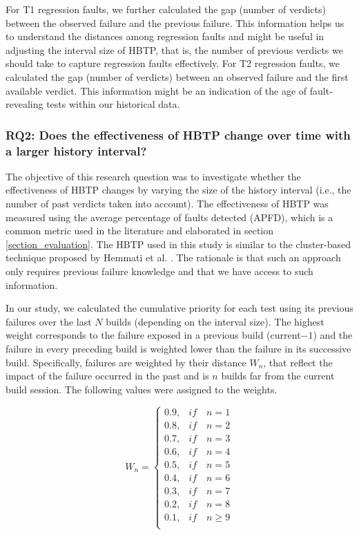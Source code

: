 \documentclass[1p]{elsarticle}
\begin{document}
For T1 regression faults, we further calculated the gap (number of verdicts) between the observed failure and the previous failure. This information helps us to understand the distances among regression faults and might be useful in adjusting the interval size of HBTP, that is, the number of previous verdicts we should take to capture regression faults effectively. For T2 regression faults, we calculated the gap (number of verdicts) between an observed failure and the first available verdict. This information might be an indication of the age of fault-revealing tests within our historical data.

\subsubsection{RQ2: Does the effectiveness of HBTP change over time with a larger history interval?}

The objective of this research question was to investigate whether the effectiveness of HBTP changes by varying the size of the history interval (i.e., the number of past verdicts taken into account). The effectiveness of HBTP was measured using the average percentage of faults detected (APFD), which is a common metric used in the literature and elaborated in section \ref{section_evaluation}. The HBTP used in this study is similar to the cluster-based technique proposed by Hemmati et al. \cite{hemmati2017prioritizing}. The rationale is that such an approach only requires previous failure knowledge and that we have access to such information. 

In our study, we calculated the cumulative priority for each test using its previous failures over the last $N$ builds (depending on the interval size). The highest weight corresponds to the failure exposed in a previous build (current$-1$) and the failure in every preceding build is weighted lower than the failure in its successive build. Specifically, failures are weighted by their distance $W_n$, that reflect the impact of the failure occurred in the past and is $n$ builds far from the current build session. The following values were assigned to the weights.

\begin{equation*}
    W_n = \begin{cases}
               0.9, & if \quad n = 1 \\
               0.8, & if \quad n = 2 \\
               0.7, & if \quad n = 3 \\
               0.6, & if \quad n = 4 \\
               0.5, & if \quad n = 5 \\
               0.4, & if \quad n = 6 \\
               0.3, & if \quad n = 7 \\
               0.2, & if \quad n = 8 \\
               0.1, & if \quad n \geq 9 \\
           \end{cases}
\end{equation*}
\end{document}
